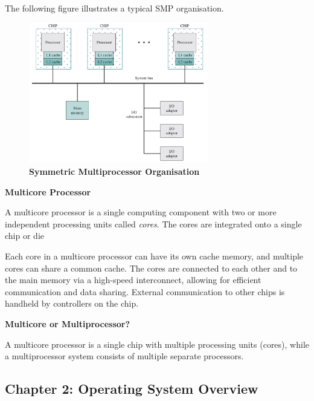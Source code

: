 \documentclass{article}
\begin{document}
The following figure illustrates a typical SMP organisation.
\begin{figure}[!h]
    \centering
    \includegraphics[width=0.7\textwidth]{figures/Ch01Figure10.png} %
    \caption{\textbf{Symmetric Multiprocessor Organisation}}
    \label{fig:Ch01Fig10}
\end{figure}

\begin{definitionbox}
    \textbf{Multicore Processor}

    A multicore processor is a single computing component with two or more independent processing 
    units called \textit{cores}. The cores are integrated onto a single chip or die
\end{definitionbox}

Each core in a multicore processor can have its own cache memory, and multiple cores can share a common cache.
The cores are connected to each other and to the main memory via a high-speed interconnect, allowing for efficient communication and data sharing.
External communication to other chips is handheld by controllers on the chip.

\begin{notebox}
    \textbf{Multicore or Multiprocessor?}

    A multicore processor is a single chip with multiple processing units (cores), 
    while a multiprocessor system consists of multiple separate processors.

\end{notebox}

\newpage

\subsection*{Chapter 2: Operating System Overview}
{}
\setcounter{figure}{0}
\end{document}
